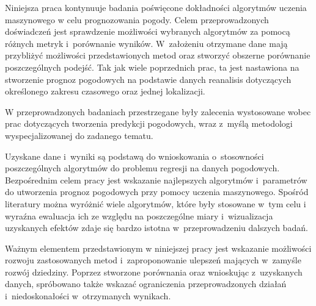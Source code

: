 Niniejsza praca kontynuuje badania poświęcone dokładności algorytmów uczenia maszynowego
w celu prognozowania pogody. Celem przeprowadzonych doświadczeń jest sprawdzenie 
możliwości wybranych algorytmów za pomocą różnych metryk i~porównanie wyników. W~założeniu
otrzymane dane mają przybliżyć możliwości przedstawionych metod oraz stworzyć obszerne porównanie
poszczególnych podejść. Tak jak wiele poprzednich prac, ta jest nastawiona na stworzenie
prognoz pogodowych na podstawie danych reanalisis dotyczących określonego zakresu czasowego oraz 
jednej lokalizacji.

W przeprowadzonych badaniach przestrzegane były zalecenia wystosowane wobec 
prac dotyczących tworzenia predykcji pogodowych, wraz z~myślą metodologi
wyspecjalizowanej do zadanego tematu.

Uzyskane dane i~wyniki są podstawą do wnioskowania o~stosowności poszczególnych algorytmów do
problemu regresji na danych pogodowych. Bezpośrednim celem pracy jest wskazanie najlepszych 
algorytmów i~parametrów do utworzenia prognoz pogodowych przy pomocy uczenia maszynowego.
Spośród literatury można wyróżnić wiele algorytmów, które były stosowane w~tym celu i~
wyraźna ewaluacja ich ze względu na poszczególne miary i~wizualizacja uzyskanych efektów zdaje się
bardzo istotna w~przeprowadzeniu dalszych badań.

Ważnym elementem przedstawionym w niniejszej pracy jest wskazanie możliwości rozwoju
zastosowanych metod i~zaproponowanie ulepszeń mających w~zamyśle rozwój dziedziny.
Poprzez stworzone porównania oraz wnioskując z~uzyskanych danych, spróbowano także wskazać
ograniczenia przeprowadzonych działań i~niedoskonałości w~otrzymanych wynikach.

\pagebreak